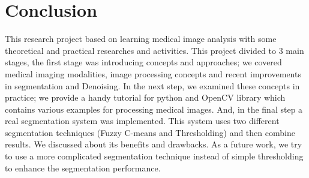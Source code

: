 \chapter{Conclusion}
\label{sec:conclusion}

\vspace{3cm}

\begin{adjustwidth}{70pt}{70pt}
	This research project based on learning medical image analysis with some theoretical and practical researches and activities. This project divided to 3 main stages, the first stage was introducing concepts and approaches; we covered medical imaging modalities, image processing concepts and recent improvements in segmentation and Denoising.  In the next step, we examined these concepts in practice; we provide a handy tutorial for python and OpenCV library which contains various examples for processing medical images. And, in the final step a real segmentation system was implemented. This system uses two different segmentation techniques (Fuzzy C-means and Thresholding) and then combine results. We discussed about its benefits and drawbacks. As a future work, we try to use a more complicated segmentation technique instead of simple thresholding to enhance the segmentation performance. 
	
\end{adjustwidth}